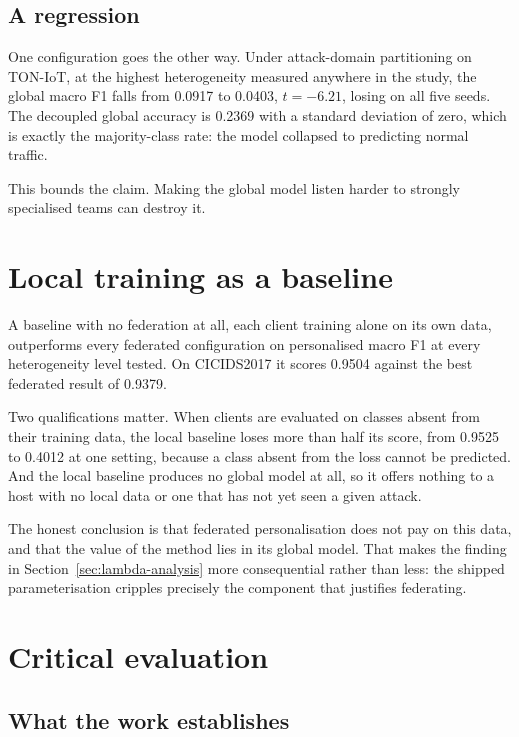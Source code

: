 \subsection{A regression}

One configuration goes the other way. Under attack-domain partitioning on
TON-IoT, at the highest heterogeneity measured anywhere in the study, the global
macro F1 falls from 0.0917 to 0.0403, $t = -6.21$, losing on all five seeds. The
decoupled global accuracy is 0.2369 with a standard deviation of zero, which is
exactly the majority-class rate: the model collapsed to predicting normal
traffic.

This bounds the claim. Making the global model listen harder to strongly
specialised teams can destroy it.

\section{Local training as a baseline}
\label{sec:local}

A baseline with no federation at all, each client training alone on its own
data, outperforms every federated configuration on personalised macro F1 at
every heterogeneity level tested. On CICIDS2017 it scores 0.9504 against the best
federated result of 0.9379.

Two qualifications matter. When clients are evaluated on classes absent from
their training data, the local baseline loses more than half its score, from
0.9525 to 0.4012 at one setting, because a class absent from the loss cannot be
predicted. And the local baseline produces no global model at all, so it offers
nothing to a host with no local data or one that has not yet seen a given attack.

The honest conclusion is that federated personalisation does not pay on this
data, and that the value of the method lies in its global model. That makes the
finding in Section~\ref{sec:lambda-analysis} more consequential rather than
less: the shipped parameterisation cripples precisely the component that
justifies federating.

\section{Critical evaluation}
\label{sec:qualitative}

\subsection{What the work establishes}

